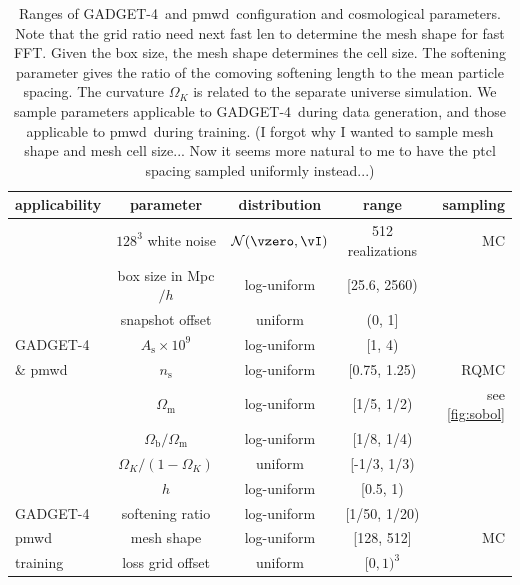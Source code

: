 \documentclass[modern, trackchanges, dvipsnames]{aastex631}
\newcommand{\pmwd}{{\usefont{T1}{nova}{m}{sl}pmwd}}
\newcommand{\GADGET}{{{\fontsize{10pt}{12pt}\selectfont GADGET}-4}}
\newcommand{\As}{A_\mathrm{s}}
\newcommand{\ns}{n_\mathrm{s}}
\newcommand{\Omegam}{\Omega_\mathrm{m}}
\newcommand{\Omegab}{\Omega_\mathrm{b}}
\newcommand{\OmegaK}{\Omega_K}
\newcommand{\YL}[1]{\textcolor{Bittersweet}{#1}}
\begin{document}
\begin{table}
  \centering
  \caption{Ranges of \GADGET\ and \pmwd\ configuration and cosmological
  parameters.
  Note that the grid ratio need next fast len to determine the mesh shape
  for fast FFT.
  Given the box size, the mesh shape determines the cell size.
  The softening parameter gives the ratio of the comoving softening length
  to the mean particle spacing.
  The curvature $\OmegaK$ is related to the separate universe simulation.
  We sample parameters applicable to \GADGET\ during data generation, and
  those applicable to \pmwd\ during training.
  \YL{(I forgot why I wanted to sample mesh shape and mesh cell size...
  Now it seems more natural to me to have the ptcl spacing sampled
  uniformly instead...)}
  }
  \label{tab:param}
  \begin{tabular}{lcccr}
  \toprule
  applicability & parameter & distribution & range & sampling \\
  \midrule
  & $128^3$ white noise & $\mathcal{N}(\vzero, \vI)$ & 512 realizations & MC \\
  \cmidrule(lr){2-5}
  & box size in Mpc$/h$ & \YL{log-uniform} & [25.6, 2560) \\
  \cmidrule(lr){2-4}
  & snapshot offset & uniform & (0, 1] \\
  \cmidrule(lr){2-4}
  \GADGET\ & $\As \times 10^9$ & log-uniform & [1, 4) \\
  \cmidrule(lr){2-4}
  \& \pmwd\ & $\ns$ & log-uniform & [0.75, 1.25) & RQMC \\
  \cmidrule(lr){2-4}
  & $\Omegam$ & log-uniform & [1/5, 1/2) & see \autoref{fig:sobol} \\
  \cmidrule(lr){2-4}
  & $\Omegab / \Omegam$ & log-uniform & [1/8, 1/4) \\
  \cmidrule(lr){2-4}
  & $\OmegaK / (1 - \OmegaK)$ & uniform & [-1/3, 1/3) \\
  \cmidrule(lr){2-4}
  & $h$ & log-uniform & [0.5, 1) \\
  \cmidrule(lr){1-4}
  \GADGET\ & softening ratio & log-uniform & [1/50, 1/20) \\
  \cmidrule(lr){1-5}
  \pmwd\ & mesh shape & log-uniform & [128, 512] & MC \\
  \cmidrule(lr){2-4}
  \cmidrule(lr){1-4}
  training & loss grid offset & uniform & $[0, 1)^3$ \\
  \bottomrule
  \end{tabular}
  \end{table}
\end{document}
